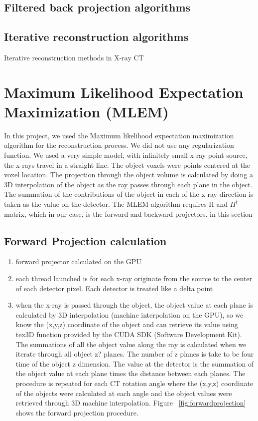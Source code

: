 \subsection{Filtered back projection algorithms}
\subsection{Iterative reconstruction algorithms}

Iterative reconstruction methods in X-ray CT~\cite{Beister}
\section{Maximum Likelihood Expectation Maximization (MLEM) }
In this project, we used the Maximum likelihood expectation maximization algorithm for the reconstruction process.  We did not use any regularization function.
We used a very simple model, with infinitely small x-ray point source, the x-rays travel in a straight line.  The object voxels were points centered at the voxel location.  The projection through the object volume is calculated by doing a 3D interpolation of the object as the ray passes through each plane in the object.  The summation of the contributions of the object in each of the x-ray direction is taken as the value on the detector.
The MLEM algorithm requires H and $H^{t}$ matrix, which in our case, is the forward and backward projectors.  
 in this section

\subsection{Forward Projection calculation}

\begin{enumerate}
\item forward projector calculated on the GPU
\item each thread launched is for each x-ray originate from the source to the center of each detector pixel.  Each detector is treated like a delta point
\item when the x-ray is passed through the object, the object value at each plane is calculated by 3D interpolation (machine interpolation on the GPU), so we know the (x,y,z) coordinate of the object and can retrieve its value using tex3D function provided by the CUDA SDK (Software Development Kit).  The summations of all the object value along the ray is calculated when we iterate through all object z? planes.  The number of z planes is take to be four time of the object z dimension.  The value at the detector is the summation of the object value at each plane times the distance between each planes.  The procedure is repeated for each CT rotation angle where the (x,y,z) coordinate of the objects were calculated at each angle and the object values were retrieved through 3D machine interpolation.  Figure ~\ref{fig:forwardprojection} shows the forward projection procedure.
\end{enumerate}

